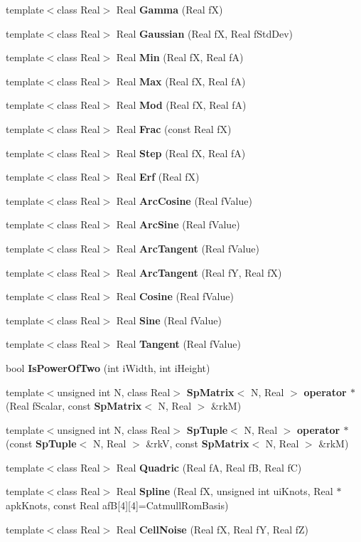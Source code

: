 \begin{CompactItemize}
\item 
template$<$class Real$>$ Real {\bf Gamma} (Real f\-X)
\item 
template$<$class Real$>$ Real {\bf Gaussian} (Real f\-X, Real f\-Std\-Dev)
\item 
template$<$class Real$>$ Real {\bf Min} (Real f\-X, Real f\-A)
\item 
template$<$class Real$>$ Real {\bf Max} (Real f\-X, Real f\-A)
\item 
template$<$class Real$>$ Real {\bf Mod} (Real f\-X, Real f\-A)
\item 
template$<$class Real$>$ Real {\bf Frac} (const Real f\-X)
\item 
template$<$class Real$>$ Real {\bf Step} (Real f\-X, Real f\-A)
\item 
template$<$class Real$>$ Real {\bf Erf} (Real f\-X)
\item 
template$<$class Real$>$ Real {\bf Arc\-Cosine} (Real f\-Value)
\item 
template$<$class Real$>$ Real {\bf Arc\-Sine} (Real f\-Value)
\item 
template$<$class Real$>$ Real {\bf Arc\-Tangent} (Real f\-Value)
\item 
template$<$class Real$>$ Real {\bf Arc\-Tangent} (Real f\-Y, Real f\-X)
\item 
template$<$class Real$>$ Real {\bf Cosine} (Real f\-Value)
\item 
template$<$class Real$>$ Real {\bf Sine} (Real f\-Value)
\item 
template$<$class Real$>$ Real {\bf Tangent} (Real f\-Value)
\item 
bool {\bf Is\-Power\-Of\-Two} (int i\-Width, int i\-Height)
\item 
template$<$unsigned int N, class Real$>$ {\bf Sp\-Matrix}$<$ N, Real $>$ {\bf operator $\ast$} (Real f\-Scalar, const {\bf Sp\-Matrix}$<$ N, Real $>$ \&rk\-M)
\item 
template$<$unsigned int N, class Real$>$ {\bf Sp\-Tuple}$<$ N, Real $>$ {\bf operator $\ast$} (const {\bf Sp\-Tuple}$<$ N, Real $>$ \&rk\-V, const {\bf Sp\-Matrix}$<$ N, Real $>$ \&rk\-M)
\item 
template$<$class Real$>$ Real {\bf Quadric} (Real f\-A, Real f\-B, Real f\-C)
\item 
template$<$class Real$>$ Real {\bf Spline} (Real f\-X, unsigned int ui\-Knots, Real $\ast$apk\-Knots, const Real af\-B[4][4]=Catmull\-Rom\-Basis)
\item 
template$<$class Real$>$ Real {\bf Cell\-Noise} (Real f\-X, Real f\-Y, Real f\-Z)

\end{CompactItemize}
